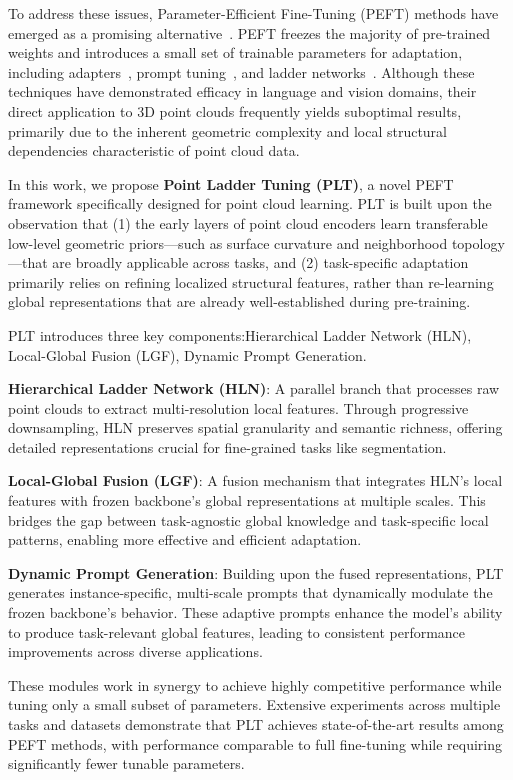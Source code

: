 To address these issues, Parameter-Efficient Fine-Tuning (PEFT) methods have emerged as a promising alternative~\cite{houlsby2019parameter, jie2023fact, karimi2021compacter}. PEFT freezes the majority of pre-trained weights and introduces a small set of trainable parameters for adaptation, including adapters~\cite{houlsby2019parameter}, prompt tuning~\cite{li2021prefix}, and ladder networks~\cite{sung2022lst}. Although these techniques have demonstrated efficacy in language and vision domains, their direct application to 3D point clouds frequently yields suboptimal results, primarily due to the inherent geometric complexity and local structural dependencies characteristic of point cloud data.

In this work, we propose \textbf{Point Ladder Tuning (PLT)}, a novel PEFT framework specifically designed for point cloud learning. PLT is built upon the observation that (1) the early layers of point cloud encoders learn transferable low-level geometric priors—such as surface curvature and neighborhood topology—that are broadly applicable across tasks, and (2) task-specific adaptation primarily relies on refining localized structural features, rather than re-learning global representations that are already well-established during pre-training.

PLT introduces three key components:Hierarchical Ladder Network (HLN), Local-Global Fusion (LGF), Dynamic Prompt Generation.

\textbf{Hierarchical Ladder Network (HLN)}: A parallel branch that processes raw point clouds to extract multi-resolution local features. Through progressive downsampling, HLN preserves spatial granularity and semantic richness, offering detailed representations crucial for fine-grained tasks like segmentation.

\textbf{Local-Global Fusion (LGF)}: A fusion mechanism that integrates HLN's local features with frozen backbone's global representations at multiple scales. This bridges the gap between task-agnostic global knowledge and task-specific local patterns, enabling more effective and efficient adaptation.

\textbf{Dynamic Prompt Generation}: Building upon the fused representations, PLT generates instance-specific, multi-scale prompts that dynamically modulate the frozen backbone's behavior. These adaptive prompts enhance the model's ability to produce task-relevant global features, leading to consistent performance improvements across diverse applications.

These modules work in synergy to achieve highly competitive performance while tuning only a small subset of parameters. Extensive experiments across multiple tasks and datasets demonstrate that PLT achieves state-of-the-art results among PEFT methods, with performance comparable to full fine-tuning while requiring significantly fewer tunable parameters.

